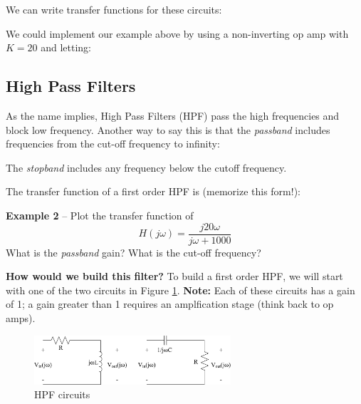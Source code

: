\documentclass{handout}
\begin{document}
We can write transfer functions for these circuits:
\soln{1.5in}{
\[
H(j\omega) = \frac{\frac{R}{L}}{j\omega +\frac{R}{L}}
\]
\[
H(j\omega) = \frac{\frac{1}{RC}}{j\omega +\frac{1}{RC}}
\]
}

We could implement our example above by using a non-inverting op amp with $K=20$ and letting:

\newpage
\clearpage
\pagebreak

\subsection{High Pass Filters}
As the name implies, High Pass Filters (HPF) pass the high frequencies and block low frequency.  Another way to say this is that the {\em passband} includes frequencies from the cut-off frequency to infinity:

The {\em stopband} includes any frequency below the cutoff frequency.

The transfer function of a first order HPF is (memorize this form!):

\textbf{Example 2} -- Plot the transfer function of
\[
H(j\omega) = \frac{j20\omega}{j\omega +1000}
\]
What is the {\em passband} gain? What is the cut-off frequency?

\newpage
\clearpage
\pagebreak

\textbf{How would we build this filter?}  To build a first order HPF, we will start with one of the two circuits in Figure \ref{fig: HPF}. \textbf{Note:} Each of these circuits has a gain of 1; a gain greater than 1 requires an amplfication stage (think back to op amps).
\begin{figure} [h!]
\centering
\includegraphics[width=0.65\textwidth]{HPF.jpg}
\caption{HPF circuits}
\label{fig: HPF}
\end{figure}
\end{document}
